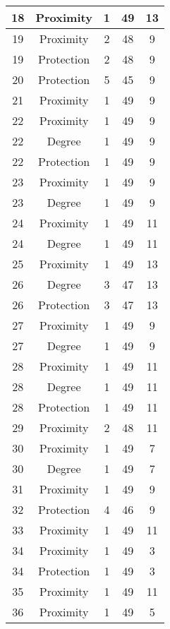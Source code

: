 \documentclass[results.tex]{subfiles}
\begin{document}
\begin{center}
\begin{tabular}{| c || c | c | c | c |}
    \hline
    18 & Proximity & 1 & 49 & 13 \\ 
    \hline
    19 & Proximity & 2 & 48 & 9 \\ 
    \hline
    19 & Protection & 2 & 48 & 9 \\ 
    \hline
    20 & Protection & 5 & 45 & 9 \\ 
    \hline
    21 & Proximity & 1 & 49 & 9 \\ 
    \hline
    22 & Proximity & 1 & 49 & 9 \\ 
    \hline
    22 & Degree & 1 & 49 & 9 \\ 
    \hline
    22 & Protection & 1 & 49 & 9 \\ 
    \hline
    23 & Proximity & 1 & 49 & 9 \\ 
    \hline
    23 & Degree & 1 & 49 & 9 \\ 
    \hline
    24 & Proximity & 1 & 49 & 11 \\ 
    \hline
    24 & Degree & 1 & 49 & 11 \\ 
    \hline
    25 & Proximity & 1 & 49 & 13 \\ 
    \hline
    26 & Degree & 3 & 47 & 13 \\ 
    \hline
    26 & Protection & 3 & 47 & 13 \\ 
    \hline
    27 & Proximity & 1 & 49 & 9 \\ 
    \hline
    27 & Degree & 1 & 49 & 9 \\ 
    \hline
    28 & Proximity & 1 & 49 & 11 \\ 
    \hline
    28 & Degree & 1 & 49 & 11 \\ 
    \hline
    28 & Protection & 1 & 49 & 11 \\ 
    \hline
    29 & Proximity & 2 & 48 & 11 \\ 
    \hline
    30 & Proximity & 1 & 49 & 7 \\ 
    \hline
    30 & Degree & 1 & 49 & 7 \\ 
    \hline
    31 & Proximity & 1 & 49 & 9 \\ 
    \hline
    32 & Protection & 4 & 46 & 9 \\ 
    \hline
    33 & Proximity & 1 & 49 & 11 \\ 
    \hline
    34 & Proximity & 1 & 49 & 3 \\ 
    \hline
    34 & Protection & 1 & 49 & 3 \\ 
    \hline
    35 & Proximity & 1 & 49 & 11 \\ 
    \hline
    36 & Proximity & 1 & 49 & 5 \\ 

\end{tabular}
\end{center}
\end{document}
